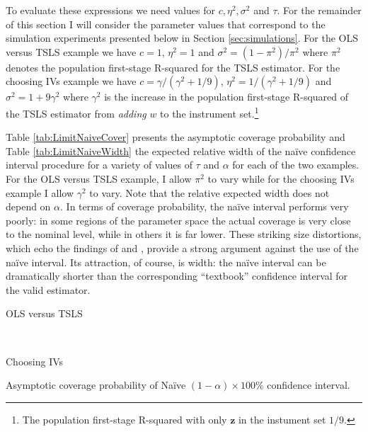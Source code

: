 To evaluate these expressions we need values for $c, \eta^2, \sigma^2$ and $\tau$.
For the remainder of this section I will consider the parameter values that correspond to the simulation experiments presented below in Section \ref{sec:simulations}.
For the OLS versus TSLS example we have $c=1$, $\eta^2=1$ and $\sigma^2 = (1-\pi^2)/\pi^2$ where $\pi^2$ denotes the population first-stage R-squared for the TSLS estimator. 
For the choosing IVs example we have $c =\gamma/(\gamma^2 +1/9)$, $\eta^2 = 1/(\gamma^2 + 1/9)$ and $\sigma^2 = 1 + 9\gamma^2$ where $\gamma^2$ is the increase in the population first-stage R-squared of the TSLS estimator from \emph{adding} $w$ to the instrument set.\footnote{The population first-stage R-squared with only $\mathbf{z}$ in the instument set $1/9$.}

Table \ref{tab:LimitNaiveCover} presents the asymptotic coverage probability and Table \ref{tab:LimitNaiveWidth} the expected relative width of the na\"{i}ve confidence interval procedure for a variety of values of $\tau$ and $\alpha$ for each of the two examples.
For the OLS versus TSLS example, I allow $\pi^2$ to vary while for the choosing IVs example I allow $\gamma^2$ to vary.
Note that the relative expected width does not depend on $\alpha$.
In terms of coverage probability, the na\"{i}ve interval performs very poorly: in some regions of the parameter space the actual coverage is very close to the nominal level, while in others it is far lower.
These striking size distortions, which echo the findings of \cite{Guggenberger2010} and \cite{Guggenberger2012}, provide a strong argument against the use of the na\"{i}ve interval.
Its attraction, of course, is width: the na\"{i}ve interval can be dramatically shorter than the corresponding ``textbook'' confidence interval for the valid estimator.

\begin{table}[h]
  \centering
  \begin{subtable}{0.48\textwidth}
    \caption{OLS versus TSLS}
    
  \end{subtable}
  ~
  \begin{subtable}{0.48\textwidth}
    \caption{Choosing IVs}
    
  \end{subtable}
  \caption{Asymptotic coverage probability of Na\"{i}ve $(1-\alpha)\times 100\%$ confidence interval.}
  \label{tab:LimitNaiveCover}
\end{table}

